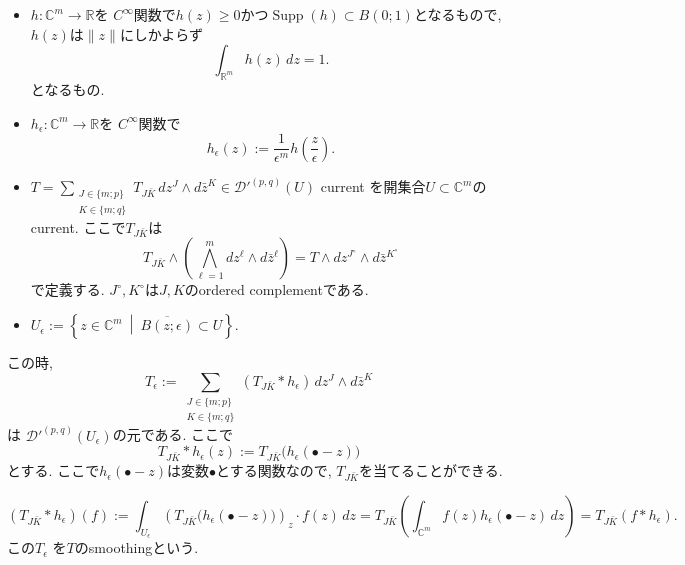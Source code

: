 \begin{tcolorbox}[mybox]
\begin{defn}
\label{defn-H-5.12}
\begin{itemize}
\item $h\colon\mathbb{C}^m\longrightarrow\mathbb{R}$を $C^\infty$関数で$h(z)\geq 0$かつ$\operatorname{Supp}(h)\subset B(0;1)$となるもので, 
$h(z)$は$\| z\|$にしかよらず
\begin{equation*}
\int_{\mathbb{R}^m}h(z)\,dz=1.
\end{equation*}
となるもの. 
\item $h_\epsilon\colon\mathbb{C}^m\longrightarrow\mathbb{R}$を $C^\infty$関数で
\begin{equation*}
h_\epsilon(z):=\frac{1}{\epsilon^m}h\left(\frac{z}{\epsilon}\right).
\end{equation*}
\item 
$
T=\sum_{\substack{J\in\{m;p\}\\K\in\{m;q\}}}
T_{J\bar K}\,dz^J\wedge d\bar z^K
\in\mathcal{D}'^{(p,q)}(U)
$
current を開集合$U\subset\mathbb{C}^m $のcurrent. 
ここで$T_{J\bar K}$は
$$T_{J\bar K}\wedge
\left(\bigwedge_{\ell=1}^m dz^\ell\wedge d\bar z^\ell\right)
=
T\wedge dz^{J^\circ}\wedge d\bar z^{K^\circ}
$$
で定義する. 
$J^\circ,K^\circ$は$J, K$のordered complementである. 
\item 
$
U_\epsilon:=
\left\{
z\in\mathbb{C}^m
\ \middle|\
\overline{B(z;\epsilon)}\subset U
\right\}.
$
\end{itemize}
この時, 
\begin{equation*}
T_\epsilon:=
\sum_{\substack{J\in\{m;p\}\\K\in\{m;q\}}}
(T_{J\bar K}*h_\epsilon)\,dz^J\wedge d\bar z^K
\end{equation*}
 は $\mathcal{D}'^{(p,q)}(U_\epsilon)$の元である. 
 ここで
\begin{equation*}
T_{J\bar K}*h_\epsilon(z):= T_{J\bar K}\bigl(h_\epsilon(\bullet-z)\bigr)
\end{equation*}
とする. ここで$h_\epsilon(\bullet-z)$は変数$\bullet$とする関数なので, $T_{J\bar K}$を当てることができる. 

\begin{equation*}
(T_{J\bar K}*h_\epsilon)(f)
:=
\int_{U_\epsilon}
\left(T_{J\bar K}\bigl(h_\epsilon(\bullet-z)\bigr)\right)_z
\cdot f(z)\,dz
=
T_{J\bar K}
\left(
\int_{\mathbb{C}^m}f(z)h_\epsilon(\bullet-z)\,dz
\right)
=
T_{J\bar K}(f*h_\epsilon).
\end{equation*}
この$T_\epsilon$ を$T$のsmoothingという. 
\end{defn}
\end{tcolorbox}


